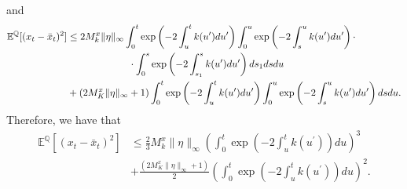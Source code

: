\documentclass[a4paper,10pt]{article}
\newcommand{\1}{\mathbf{1}}
\begin{document}
and
\begin{align*}
\mathbb{E}^{\mathbb{Q}}[(x_t - \bar{x}_t)^{2}] &\leq 2 M^{x}_k \|\eta\|_{\infty} \int_{0}^{t} \exp\left(- 2\int_{u}^{t} k(u^{\prime}) du^{\prime}\right)\int_{0}^{u} \exp\left(- 2\int_{s}^{u} k(u^{\prime}) du^{\prime}\right) \cdot \\
& \qquad \hspace{1.5cm} \cdot \int_{0}^{s}  \exp\left(- 2\int_{s_1}^{s} k(u^{\prime}) du^{\prime}\right) ds_1 ds du \\
&+ (2 M^{x}_K \|\eta\|_{\infty} + 1) \int_{0}^{t}  \exp\left(- 2\int_{u}^{t} k(u^{\prime}) du^{\prime}\right)  \int_{0}^{u} \exp\left(- 2\int_{s}^{u} k(u^{\prime}) du^{\prime}\right) ds du.
\end{align*}
Therefore, we have that
\begin{align*}
\mathbb{E}^{\mathbb{Q}}[(x_t - \bar{x}_t)^{2}] &\leq \frac{2}{3} M^{x}_k \|\eta\|_{\infty} \left( \int_{0}^{t} \exp\left(- 2\int_{u}^{t} k(u^{\prime}) \right) du  \right)^{3}  \\
&+ \frac{(2 M^{x}_K \|\eta\|_{\infty} + 1)}{2} \left( \int_{0}^{t}  \exp\left(- 2\int_{u}^{t} k(u^{\prime}) \right) du  \right)^{2}.
\end{align*}
\end{document}
